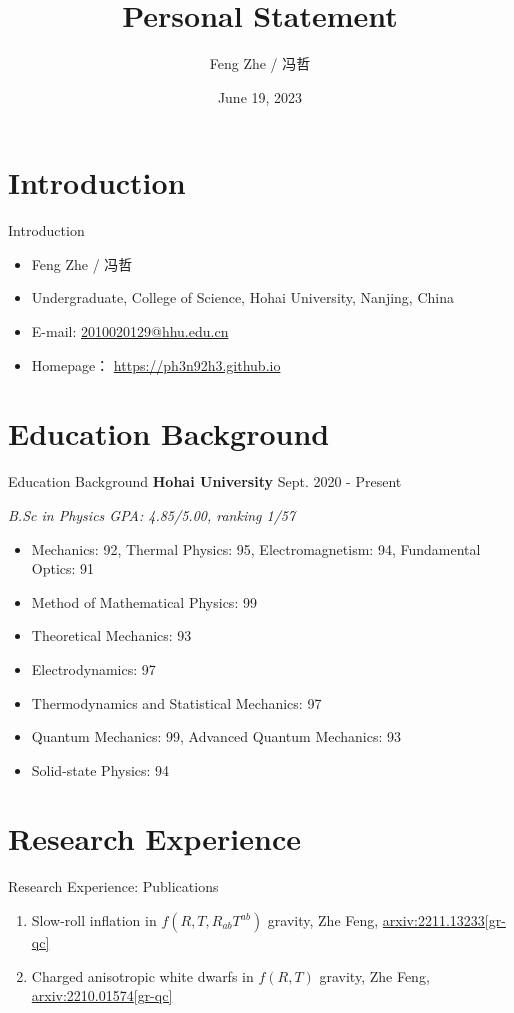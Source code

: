 \documentclass[9pt,aspectratio=169,hyperref=colorlinks]{beamer}
\title{Personal Statement}
\institute{College of Science, Hohai University}
\author{Feng Zhe / 冯哲}
\date{June 19, 2023}
\begin{document}
\frame{\titlepage}

\section{Introduction}
\begin{frame}{Introduction}
    \begin{itemize}
        \item Feng Zhe / 冯哲
        \item Undergraduate, College of Science, Hohai University, Nanjing, China
        \item E-mail: \href{mailto:2010020129@hhu.edu.cn}{2010020129@hhu.edu.cn}
        \item Homepage： \href{https://ph3n92h3.github.io}{https://ph3n92h3.github.io}
    \end{itemize}
\end{frame}

\section{Education Background}
\begin{frame}{Education Background}
    \textbf{Hohai University} \hfill Sept. 2020 - Present

    \textit{B.Sc in Physics \hfill GPA: 4.85/5.00, ranking 1/57}

    \begin{itemize}
        \item Mechanics: 92, Thermal Physics: 95, Electromagnetism: 94, Fundamental Optics: 91
        \item Method of Mathematical Physics: 99
        \item Theoretical Mechanics: 93
        \item Electrodynamics: 97
        \item Thermodynamics and Statistical Mechanics: 97
        \item Quantum Mechanics: 99, Advanced Quantum Mechanics: 93
        \item Solid-state Physics: 94
    \end{itemize}
\end{frame}

\section{Research Experience}
\begin{frame}{Research Experience: Publications}
    \begin{enumerate}
        \item Slow-roll inflation in $f\left(R, T, R_{ab}T^{ab}\right)$ gravity, Zhe Feng, \href{https://arxiv.org/abs/2211.13233}{arxiv:2211.13233[gr-qc]}
        \item Charged anisotropic white dwarfs in $f\left({R}, {T}\right)$ gravity, Zhe Feng, \href{https://arxiv.org/abs/2210.01574}{arxiv:2210.01574[gr-qc]}
    \end{enumerate}
\end{frame}
\end{document}

